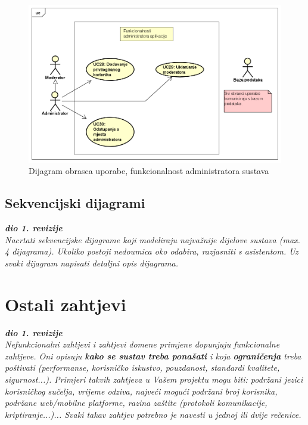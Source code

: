 \begin{figure}[H]
	\includegraphics[scale=0.4]{slike/DijagramObrazacaUporabe3.PNG}
	\centering
	\caption{Dijagram obrasca uporabe, funkcionalnost administratora sustava}
	\label{fig:obrazac_uporabe3}
\end{figure}

\eject	

\subsection{Sekvencijski dijagrami}

\textbf{\textit{dio 1. revizije}}\\

\textit{Nacrtati sekvencijske dijagrame koji modeliraju najvažnije dijelove sustava (max. 4 dijagrama). Ukoliko postoji nedoumica oko odabira, razjasniti s asistentom. Uz svaki dijagram napisati detaljni opis dijagrama.}
\eject

\section{Ostali zahtjevi}

\textbf{\textit{dio 1. revizije}}\\

\textit{Nefunkcionalni zahtjevi i zahtjevi domene primjene dopunjuju funkcionalne zahtjeve. Oni opisuju \textbf{kako se sustav treba ponašati} i koja \textbf{ograničenja} treba poštivati (performanse, korisničko iskustvo, pouzdanost, standardi kvalitete, sigurnost...). Primjeri takvih zahtjeva u Vašem projektu mogu biti: podržani jezici korisničkog sučelja, vrijeme odziva, najveći mogući podržani broj korisnika, podržane web/mobilne platforme, razina zaštite (protokoli komunikacije, kriptiranje...)... Svaki takav zahtjev potrebno je navesti u jednoj ili dvije rečenice.}
